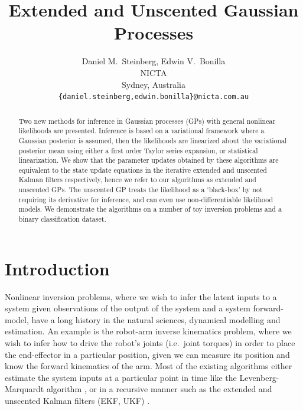\documentclass{article} %
\title{Extended and Unscented Gaussian Processes}
\author{
    Daniel M.~Steinberg, Edwin V.~Bonilla \\
    NICTA \\
    Sydney, Australia\\
    \texttt{\{daniel.steinberg,edwin.bonilla\}@nicta.com.au}
}
\begin{document}
\maketitle

\begin{abstract}

    Two new methods for inference in Gaussian processes (GPs) with general
    nonlinear likelihoods are presented. Inference is based on a variational
    framework where a Gaussian posterior is assumed, then the likelihoods are
    linearized about the variational posterior mean using either a first order
    Taylor series expansion, or statistical linearization. We show that the
    parameter updates obtained by these algorithms are equivalent to the state
    update equations in the iterative extended and unscented Kalman filters
    respectively, hence we refer to our algorithms as extended and
    unscented GPs. The unscented GP treats the likelihood as a `black-box' by
    not requiring its derivative for inference, and can even use
    non-differentiable likelihood models. We demonstrate the algorithms on a
    number of toy inversion problems and a binary classification dataset.

\end{abstract}


\section{Introduction}

Nonlinear inversion problems, where we wish to infer the latent inputs to a
system given observations of the output of the system and a system
forward-model, have a long history in the natural sciences, dynamical modelling
and estimation. An example is the robot-arm inverse kinematics problem, where
we wish to infer how to drive the robot's joints (i.e.~joint torques) in order
to place the end-effector in a particular position, given we can measure its
position and know the forward kinematics of the arm. Most of the existing
algorithms either estimate the system inputs at a particular point in time like
the Levenberg-Marquardt algorithm \cite{Marquardt1963}, or in a recursive
manner such as the extended and unscented Kalman filters (EKF, UKF)
\cite{Julier2004}. 
\end{document}
